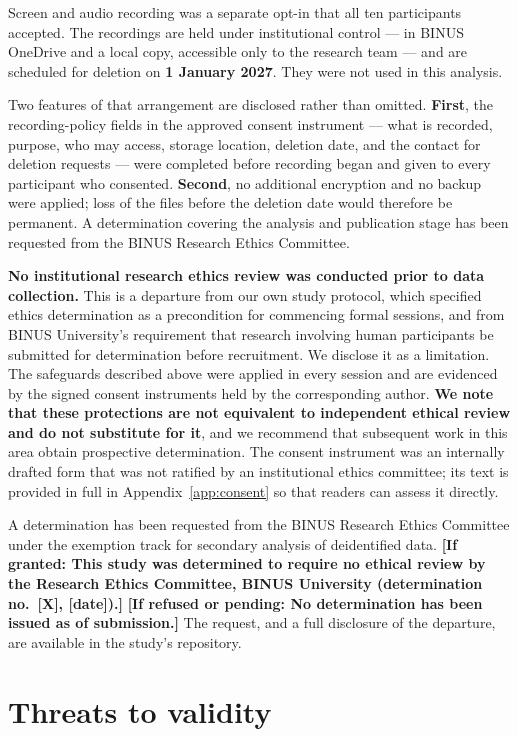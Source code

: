 \documentclass[]{interact}
\theoremstyle{plain}
\begin{document}
Screen and audio recording was a separate opt-in that all ten participants accepted. The recordings are
held under institutional control --- in BINUS OneDrive and a local copy, accessible only to the research
team --- and are scheduled for deletion on \textbf{1 January 2027}. They were not used in this analysis.

Two features of that arrangement are disclosed rather than omitted. \textbf{First}, the
recording-policy fields in the approved consent instrument --- what is recorded, purpose, who may
access, storage location, deletion date, and the contact for deletion requests --- were completed
before recording began and given to every participant who consented. \textbf{Second}, no additional
encryption and no backup were applied; loss of the files before the deletion date would therefore be
permanent. A determination covering the analysis and publication stage has been requested from the
BINUS Research Ethics Committee.

\textbf{No institutional research ethics review was conducted prior to data collection.} This is a
departure from our own study protocol, which specified ethics determination as a precondition for
commencing formal sessions, and from BINUS University's requirement that research involving human
participants be submitted for determination before recruitment. We disclose it as a limitation. The
safeguards described above were applied in every session and are evidenced by the signed consent
instruments held by the corresponding author. \textbf{We note that these protections are not
equivalent to independent ethical review and do not substitute for it}, and we recommend that
subsequent work in this area obtain prospective determination. The consent instrument was an
internally drafted form that was not ratified by an institutional ethics committee; its text is
provided in full in Appendix~\ref{app:consent} so that readers can assess it directly.

A determination has been requested from the BINUS Research Ethics Committee under the exemption track
for secondary analysis of deidentified data. \textbf{[If granted: This study was determined to require
no ethical review by the Research Ethics Committee, BINUS University (determination no.~[X],
[date]).]} \textbf{[If refused or pending: No determination has been issued as of submission.]} The
request, and a full disclosure of the departure, are available in the study's repository.

\section{Threats to validity}
\label{sec:threats}
\end{document}

